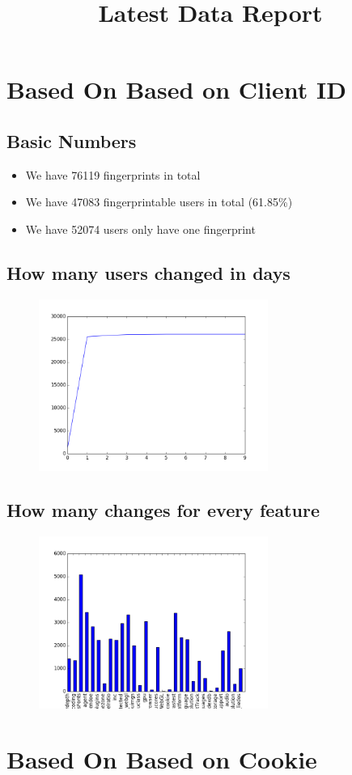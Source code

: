 \documentclass[10pt, conference, compsocconf]{IEEEtran}
\begin{document}
\title{Latest Data Report}
\author{
}
\maketitle
\section{Based On Based on Client ID}
\subsection{Basic Numbers}
\begin{itemize}\item We have 76119 fingerprints in total\item We have 47083 fingerprintable users in total (61.85\%)\item We have 52074 users only have one fingerprint \end{itemize}\subsection{How many users changed in days}
\begin{figure}[H]\centering\includegraphics[width=75mm,scale=0.5]{BasedonClientIDchangebytime}\end{figure}\subsection{How many changes for every feature}
\begin{figure}[H]\centering\includegraphics[width=75mm,scale=0.5]{BasedonClientIDfeaturechange}\end{figure}\section{Based On Based on Cookie}
\end{document}
